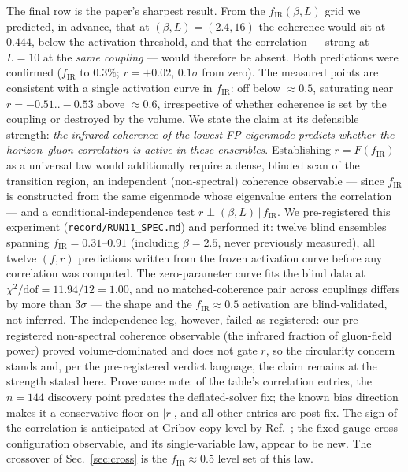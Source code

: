 \documentclass[11pt]{article}
\begin{document}
The final row is the paper's sharpest result. From the $f_{\mathrm{IR}}(\beta,L)$ grid we
predicted, in advance, that at $(\beta,L)=(2.4,16)$ the coherence would sit at $0.444$,
below the activation threshold, and that the correlation --- strong at $L=10$ at the
\emph{same coupling} --- would therefore be absent. Both predictions were confirmed
($f_{\mathrm{IR}}$ to $0.3\%$; $r=+0.02$, $0.1\sigma$ from zero). The measured points are
consistent with a single activation curve in $f_{\mathrm{IR}}$: off below $\approx0.5$,
saturating near $r=-0.51..-0.53$ above $\approx0.6$, irrespective of whether coherence is
set by the coupling or destroyed by the volume. We state the claim at its defensible
strength: \emph{the infrared coherence of the lowest FP eigenmode predicts whether the
horizon--gluon correlation is active in these ensembles}. Establishing $r=F(f_{\mathrm{IR}})$
as a universal law would additionally require a dense, blinded scan of the transition
region, an independent (non-spectral) coherence observable --- since $f_{\mathrm{IR}}$ is
constructed from the same eigenmode whose eigenvalue enters the correlation --- and a
conditional-independence test $r\perp(\beta,L)\,|\,f_{\mathrm{IR}}$. We pre-registered
this experiment (\texttt{record/RUN11\_SPEC.md}) and performed it: twelve blind
ensembles spanning $f_{\mathrm{IR}}=0.31$--$0.91$ (including $\beta=2.5$, never
previously measured), all twelve $(f,r)$ predictions written from the frozen
activation curve before any correlation was computed. The zero-parameter curve fits
the blind data at $\chi^2/\mathrm{dof}=11.94/12=1.00$, and no matched-coherence pair
across couplings differs by more than $3\sigma$ --- the shape and the
$f_{\mathrm{IR}}\approx0.5$ activation are blind-validated, not inferred. The
independence leg, however, failed as registered: our pre-registered non-spectral
coherence observable (the infrared fraction of gluon-field power) proved
volume-dominated and does not gate $r$, so the circularity concern stands and, per
the pre-registered verdict language, the claim remains at the strength stated here. Provenance note: of the
table's correlation entries, the $n{=}144$ discovery point predates the deflated-solver
fix; the known bias direction makes it a conservative floor on $|r|$, and all other
entries are post-fix. The sign of the correlation is anticipated at
Gribov-copy level by Ref.~\cite{SternbeckMP12}; the fixed-gauge cross-configuration
observable, and its single-variable law, appear to be new. The crossover of
Sec.~\ref{sec:cross} is the $f_{\mathrm{IR}}\approx0.5$ level set of this law.
\end{document}
